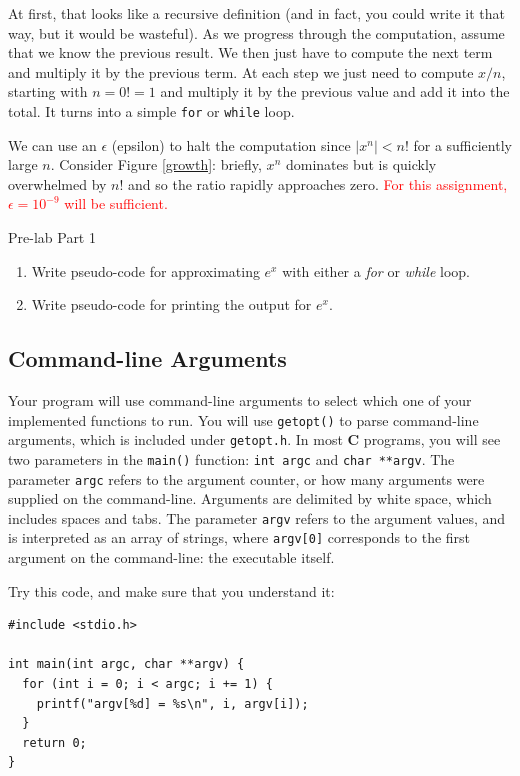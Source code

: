 \documentclass[11pt]{article}
\begin{document}
At first, that looks like a recursive definition (and in fact, you
could write it that way, but it would be wasteful). As we progress
through the computation, assume that we know the previous result.
We then just have to compute the next term and multiply it by the
previous term.  At each step we just need to compute ${x} / {n}$,
starting with $n= 0! = 1$ and multiply it by the previous value and
add it into the total.  It turns into a simple \texttt{for} or
\texttt{while} loop.

We can use an $\epsilon$ (epsilon) to halt the computation since
$|x^n| < n!$ for a sufficiently large $n$.  Consider Figure \ref{growth}:
briefly, $x^n$ dominates but is quickly overwhelmed by $n!$ and so
the ratio rapidly approaches zero.
\textcolor{red}{For this assignment, $\epsilon = 10^{-9}$ will be sufficient.} \\

\begin{prelab}{Pre-lab Part 1}
  \begin{enumerate}
    \item Write pseudo-code for approximating $e^x$ with either a \textit{for} or
          \textit{while} loop.
    \item Write pseudo-code for printing the output for $e^x$.
  \end{enumerate}
\end{prelab}

\subsection{Command-line Arguments}
Your program will use command-line arguments to select which one of your
implemented functions to run. You will use \texttt{getopt()} to parse
command-line arguments, which is included under \texttt{getopt.h}. In most
\textbf{C} programs, you will see two parameters in the \texttt{main()}
function: \texttt{int argc} and \texttt{char **argv}. The parameter
\texttt{argc} refers to the argument counter, or how many arguments were
supplied on the command-line. Arguments are delimited by white space, which
includes spaces and tabs.  The parameter \texttt{argv} refers to the argument values, and
is interpreted as an array of strings, where \texttt{argv[0]} corresponds to the
first argument on the command-line: the executable itself.

Try this code, and make sure that you understand it:
\begin{lstlisting}
#include <stdio.h>

int main(int argc, char **argv) {
  for (int i = 0; i < argc; i += 1) {
    printf("argv[%d] = %s\n", i, argv[i]);
  }
  return 0;
}
\end{lstlisting}
\end{document}
